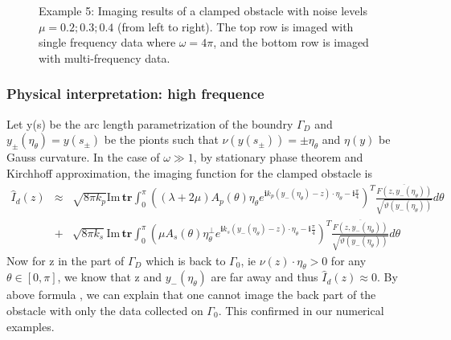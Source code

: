 \documentclass[cjk,8pt]{beamer}
\renewcommand{\i}{\mathbf{i}}
\renewcommand{\Im}{\mathrm{Im}\,}
\newcommand{\om}{\omega}
\newcommand{\Ga}{\Gamma}
\renewcommand{\i}{\mathbf{i}}
\renewcommand{\Im}{\mathrm{Im}\,}
\newcommand{\ben}{\begin{eqnarray*}}
\newcommand{\een}{\end{eqnarray*}}
\begin{document}
\begin{CJK*}{GBK}{kai}
\begin{frame}
\begin{figure}[h]
	\caption{Example 5: Imaging results of a clamped obstacle with noise levels $\mu =  0.2; 0.3; 0.4$ (from left to
		right). The top row is imaged with single frequency data where $\om=4\pi$, and the
		bottom row is imaged with multi-frequency data.}
\end{figure}
\end{frame}

\begin{frame}
\frametitle{Physical interpretation: high frequence}
Let y(s) be the arc length parametrization of the boundry $\Ga_D$ and $y_{\pm}(\eta_\theta)=y(s_{\pm})$ be the pionts such that $\nu(y(s_{\pm}))=\pm\eta_\theta$ and $\eta(y)$ be Gauss curvature. In the case of $\omega\gg1$, by stationary phase theorem and Kirchhoff approximation, the imaging function for the clamped obstacle is
\ben
\hat{I}_d(z)&\approx&\sqrt{8\pi k_p}\Im\mathbf{tr} \int_{0}^{\pi}((\lambda+2\mu)A_p(\theta)\eta_\theta e^{\i k_p (y_-(\eta_\theta)-z)\cdot \eta_\theta-\i\frac{\pi}{4}})^T\frac{\overline{F(z,y_-(\eta_\theta))}}{\sqrt{\vartheta(y_-(\eta_\theta))}}d\theta \\
&+&\sqrt{8\pi k_s}\Im\mathbf{tr} \int_{0}^{\pi}(\mu A_s(\theta)\eta_\theta^\perp e^{\i k_s (y_-(\eta_\theta)-z)\cdot \eta_\theta-\i\frac{\pi}{4}})^T\frac{\overline{F(z,y_-(\eta_\theta))}}{\sqrt{\vartheta(y_-(\eta_\theta))}}d\theta
\een
Now for z in the part of $\Ga_D$ which is back to $\Ga_0$, ie $\nu(z)\cdot\eta_\theta>0$ for any $\theta\in[0,\pi]$, we know that z and $y_{-}(\eta_\theta)$ are far away and thus $\hat{I}_d(z)\approx0$. By above formula , we can explain that one cannot image the back part of the obstacle with only the data collected on $\Ga_0$. This confirmed in our numerical examples.
\end{frame}



\end{CJK*}
\end{document}

